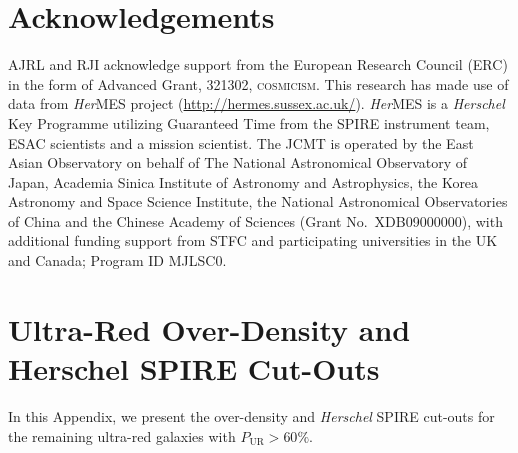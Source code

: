 \documentclass[a4paper, fleqn, usenatbib]{mnras}
\newcommand{\hermes}{\textit{Her}MES}
\newcommand{\herschel}{\textit{Herschel}}
\newcommand{\pur}{P_{\text{UR}}}
\newcommand{\urgs}{ultra-red galaxies}
\begin{document}
\section*{Acknowledgements}

AJRL and RJI acknowledge support from the European Research Council (ERC) in the form of Advanced Grant, 321302, \textsc{cosmicism}.
%
This research has made use of data from \hermes{} project
(\url{http://hermes.sussex.ac.uk/}). \hermes{} is a \herschel{} Key
Programme utilizing Guaranteed Time from the SPIRE instrument team, ESAC
scientists and a mission scientist.
%
The JCMT is operated by the East Asian Observatory on behalf of The National Astronomical Observatory of Japan, Academia Sinica Institute of Astronomy and Astrophysics, the Korea Astronomy and Space Science Institute, the National Astronomical Observatories of China and the Chinese Academy of Sciences (Grant No.~XDB09000000), with additional funding support from STFC and participating universities in the UK and Canada; Program ID MJLSC0.




\appendix

\section{Ultra-Red Over-Density and Herschel SPIRE Cut-Outs}
\label{app:cut_outs}

In this Appendix, we present the over-density and \herschel{} SPIRE cut-outs for the remaining \urgs{} with $\pur{}>60\%$.
\end{document}
